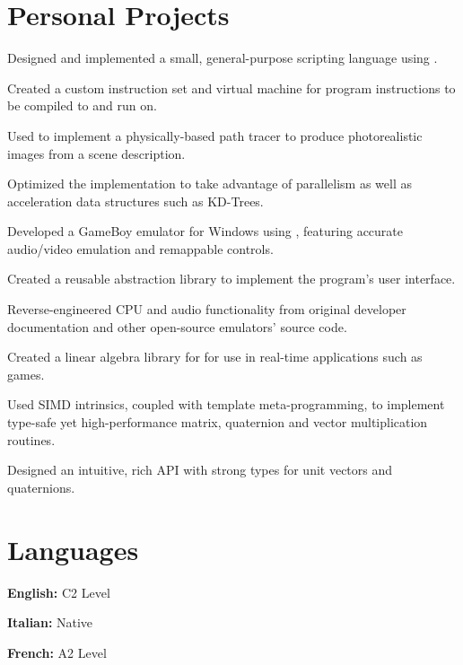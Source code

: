 \section*{Personal Projects}
\begin{cventries}
  {}
  {%
    \begin{cvitems}
    \item Designed and implemented a small, general-purpose scripting language using .\textbf{}
    \item Created a custom instruction set and virtual machine for program instructions to be compiled to and run on.
    \end{cvitems}
  }
  {}
  {%
    \begin{cvitems}
    \item Used  to implement a physically-based path tracer to produce photorealistic images from a scene description.\textbf{}
      \item Optimized the implementation to take advantage of parallelism as well as acceleration data structures such as KD-Trees.
    \end{cvitems}
  }
  {}
  {%
    \begin{cvitems}
    \item Developed a GameBoy emulator for Windows using , featuring accurate audio/video emulation and remappable controls.\textbf{}
    \item Created a reusable  abstraction library to implement the program's user interface.
    \item Reverse-engineered CPU and audio functionality from original developer documentation and other open-source emulators' source code.
    \end{cvitems}
  }
  {}
  {%
    \begin{cvitems}
    \item Created a linear algebra library for  for use in real-time applications such as games.\textbf{}
    \item Used SIMD intrinsics, coupled with template meta-programming, to implement type-safe yet high-performance matrix, quaternion and vector multiplication routines.
    \item Designed an intuitive, rich API with strong types for unit vectors and quaternions.
    \end{cvitems}
  }
\end{cventries}

\section*{Languages}
\begin{cvitems}
\item \textbf{English: } C2 Level
\item \textbf{Italian: } Native
\item \textbf{French: } A2 Level
\end{cvitems}
